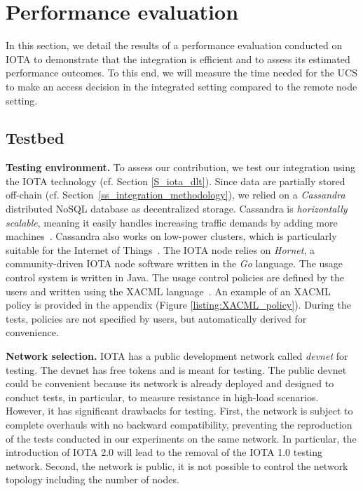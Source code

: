 \section{Performance evaluation}
\label{S_performance_evaluation}

In this section, we detail the results of a performance evaluation conducted on IOTA to demonstrate that the integration is efficient and to assess its estimated performance outcomes. To this end, we will measure the time needed for the UCS to make an access decision in the integrated setting compared to the remote node setting.

\subsection{Testbed}
\label{ss_testbed}
 \textbf{Testing environment.} To assess our contribution, we test our integration using the IOTA technology (cf. Section \ref{S_iota_dlt}). Since data are partially stored off-chain (cf. Section~\ref{ss_integration_methodology}), we relied on a \emph{Cassandra} distributed NoSQL database as decentralized storage. Cassandra is \emph{horizontally scalable}, meaning it easily handles increasing traffic demands by adding more machines~\cite{Silva2021}. Cassandra also works on low-power clusters, which is particularly suitable for the Internet of Things~\cite{Silva2021}.
 The IOTA node relies on \emph{Hornet}, a community-driven IOTA node software written in the \emph{Go} language. The usage control system is written in Java. The usage control policies are defined by the users and written using the XACML language~\cite{Godik2003}. An example of an XACML policy is provided in the appendix (Figure \ref{listing:XACML_policy}). During the tests, policies are not specified by users, but automatically derived for convenience.

\textbf{Network selection.}
IOTA has a public development network called \emph{devnet} for testing. The devnet has free tokens and is meant for testing. The public devnet could be convenient because its network is already deployed and designed to conduct tests, in particular, to measure resistance in high-load scenarios. However, it has significant drawbacks for testing. First, the network is subject to complete overhauls with no backward compatibility, preventing the reproduction of the tests conducted in our experiments on the same network. In particular, the introduction of IOTA 2.0 will lead to the removal of the IOTA 1.0 testing network. Second, the network is public, it is not possible to control the network topology including the number of nodes.

